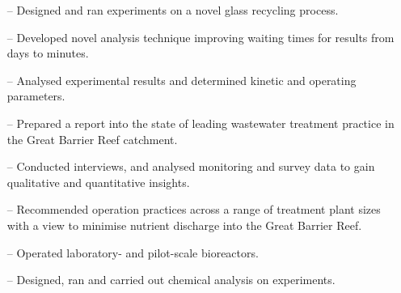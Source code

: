 \documentclass[10pt,a4paper]{altacv}
\begin{document}
\begin{itemize}
    \setlength{\itemindent}{0.5em}
    \item[--]   \small{Designed and ran experiments on a novel glass recycling process.}
    \item[--]   \small{Developed novel analysis technique improving waiting times for results from days to minutes.}
    \item[--]   \small{Analysed experimental results and determined kinetic and operating parameters.}
\end{itemize}
\divider\smallskip


\begin{itemize}
    \setlength{\itemindent}{0.5em}
    \item[--]   \small{Prepared a report into the state of leading wastewater treatment practice in the Great Barrier Reef catchment.}
    \item[--]   \small{Conducted interviews, and analysed monitoring and survey data to gain qualitative and quantitative insights.}
    \item[--]   \small{Recommended operation practices across a range of treatment plant sizes with a view to minimise         nutrient discharge into the Great Barrier Reef.}
\end{itemize}
\divider\smallskip


\begin{itemize}
    \setlength{\itemindent}{0.5em}
    \item[--]   \small{Operated laboratory- and pilot-scale bioreactors.}
    \item[--]   \small{Designed, ran and carried out chemical analysis on experiments.}
\end{itemize}

\divider\medskip







\newpage
\end{document}
